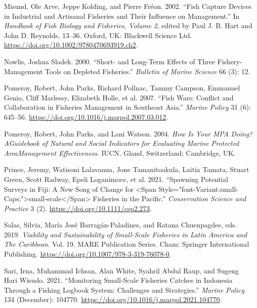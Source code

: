 \documentclass[
]{article}
\newlength{\cslhangindent}
\newlength{\cslentryspacingunit} %
\newenvironment{CSLReferences}[2] %
 {%
  \setlength{\parindent}{0pt}
  \ifodd #1
  \let\oldpar\par
  \def\par{\hangindent=\cslhangindent\oldpar}
  \fi
  \setlength{\parskip}{#2\cslentryspacingunit}
 }%
 {}
\begin{document}
\begin{CSLReferences}{1}{0}
\leavevmode{}%
Misund, Ole Arve, Jeppe Kolding, and Pierre Fréon. 2002. {``Fish {Capture} {Devices} in {Industrial} and {Artisanal} {Fisheries} and Their {Influence} on {Management}.''} In \emph{Handbook of {Fish} {Biology} and {Fisheries}, {Volume} 2}, edited by Paul J. B. Hart and John D. Reynolds, 13--36. Oxford, UK: Blackwell Science Ltd. \url{https://doi.org/10.1002/9780470693919.ch2}.

\leavevmode{}%
Nowlis, Joshua Sladek. 2000. {``Short- and Long-Term Effects of Three Fishery-Management Tools on Depleted Fisheries.''} \emph{Bulletin of Marine Science} 66 (3): 12.

\leavevmode{}%
Pomeroy, Robert, John Parks, Richard Pollnac, Tammy Campson, Emmanuel Genio, Cliff Marlessy, Elizabeth Holle, et al. 2007. {``Fish Wars: {Conflict} and Collaboration in Fisheries Management in {Southeast} {Asia}.''} \emph{Marine Policy} 31 (6): 645--56. \url{https://doi.org/10.1016/j.marpol.2007.03.012}.

\leavevmode{}%
Pomeroy, Robert, John Parks, and Lani Watson. 2004. \emph{How Is Your {MPA} Doing? {AGuidebook} of {Natural} and {Social} {Indicators} for {Evaluating} {Marine} {Protected} {AreaManagement} {Effectiveness}}. {IUCN}. Gland, Switzerland; Cambridge, UK.

\leavevmode{}%
Prince, Jeremy, Watisoni Lalavanua, Jone Tamanitoakula, Laitia Tamata, Stuart Green, Scott Radway, Epeli Loganimoce, et al. 2021. {``Spawning Potential Surveys in {Fiji}: {A} New Song of Change for {\textless{}}Span Style="font-Variant:small-Caps;"{\textgreater{}}small‐scale{\textless{}}/Span{\textgreater{}} Fisheries in the {Pacific}.''} \emph{Conservation Science and Practice} 3 (2). \url{https://doi.org/10.1111/csp2.273}.

\leavevmode{}%
Salas, Silvia, María José Barragán-Paladines, and Ratana Chuenpagdee, eds. 2019. \emph{Viability and {Sustainability} of {Small}-{Scale} {Fisheries} in {Latin} {America} and {The} {Caribbean}}. Vol. 19. {MARE} {Publication} {Series}. Cham: Springer International Publishing. \url{https://doi.org/10.1007/978-3-319-76078-0}.

\leavevmode{}%
Sari, Irna, Muhammad Ichsan, Alan White, Syahril Abdul Raup, and Sugeng Hari Wisudo. 2021. {``Monitoring Small-Scale Fisheries Catches in {Indonesia} Through a Fishing Logbook System: {Challenges} and Strategies.''} \emph{Marine Policy} 134 (December): 104770. \url{https://doi.org/10.1016/j.marpol.2021.104770}.


\end{CSLReferences}
\end{document}

